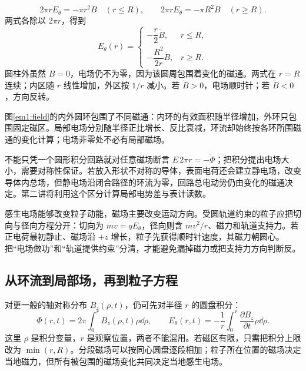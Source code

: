 \[2\pi rE_\theta=-\pi r^2\dot B\quad(r\le R),\qquad
2\pi rE_\theta=-\pi R^2\dot B\quad(r\ge R).\]
两式各除以 $2\pi r$，得到
\begin{equation}
E_\theta(r)=\begin{cases}-\dfrac r2\dot B,&r\le R,\\
-\dfrac{R^2}{2r}\dot B,&r\ge R.
\end{cases}\label{em1:inducedfield}\end{equation}
圆柱外虽然 $B=0$，电场仍不为零，因为该圆周包围着变化的磁通。两式在 $r=R$ 连续；内区随 $r$ 线性增加，外区按 $1/r$ 减小。若 $\dot B>0$，电场顺时针；若 $\dot B<0$，方向反转。


图\ref{em1:field}的内外圆环包围了不同磁通：内环的有效面积随半径增加，外环只包围固定磁区。局部电场分别随半径正比增长、反比衰减，环流却始终按各环所围磁通的变化计算；电场非零处不必有局部磁场。



不能只凭一个圆形积分回路就对任意磁场断言 $E\,2\pi r=-\dot\Phi$；把积分提出电场大小，需要对称性保证。若放入形状不对称的导体，表面电荷还会建立静电场，改变导体内总场，但静电场沿闭合路径的环流为零，回路总电动势仍由变化的磁通决定。第二讲将利用这个区分计算局部电势差与表计读数。


感生电场能够改变粒子动能，磁场主要改变运动方向。受圆轨道约束的粒子应把切向与径向方程分开：切向为 $m\dot v=qE_\theta$，径向则含 $mv^2/r$、磁力和轨道支持力。若正电荷最初静止、磁场沿 $+z$ 增长，粒子先获得顺时针速度，其磁力朝圆心。把“电场做功”和“轨道提供约束”分清，才能避免漏掉磁力或把支持力方向判断反。



\subsection{从环流到局部场，再到粒子方程}
对更一般的轴对称分布 $B_z(\rho,t)$，仍可先对半径 $r$ 的圆盘积分：
\[\Phi(r,t)=2\pi\int_0^r B_z(\rho,t)\rho\dd\rho,\qquad
E_\theta(r,t)=-\frac1r\int_0^r\frac{\partial B_z}{\partial t}\rho\dd\rho.\]
这里 $\rho$ 是积分变量，$r$ 是观察位置，两者不能混用。若磁区有限，只需把积分上限改为 $\min(r,R)$。分段磁场可以按同心圆盘逐段相加；粒子所在位置的磁场决定当地磁力，但所有被包围的磁场变化共同决定当地感生电场。


